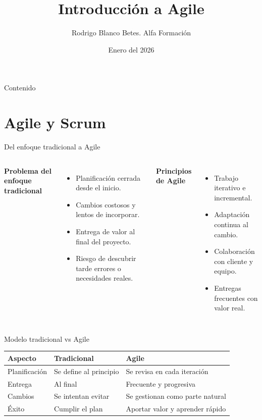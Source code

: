 \documentclass{beamer}
\title{Introducción a Agile}
\author{Rodrigo Blanco Betes. Alfa Formación}
\date{Enero del 2026}
\begin{document}
\begin{frame}
\titlepage
\end{frame}

\begin{frame}{Contenido}
\tableofcontents
\end{frame}

\section{Agile y Scrum}

\begin{frame}{Del enfoque tradicional a Agile}
\begin{columns}[T,onlytextwidth]
\textbf{Problema del enfoque tradicional}
\begin{itemize}
    \item Planificación cerrada desde el inicio.
    \item Cambios costosos y lentos de incorporar.
    \item Entrega de valor al final del proyecto.
    \item Riesgo de descubrir tarde errores o necesidades reales.
\end{itemize}

\textbf{Principios de Agile}
\begin{itemize}
    \item Trabajo iterativo e incremental.
    \item Adaptación continua al cambio.
    \item Colaboración con cliente y equipo.
    \item Entregas frecuentes con valor real.
\end{itemize}
\end{columns}
\end{frame}

\begin{frame}{Modelo tradicional vs Agile}
\vspace{0.4cm}
\small
\begin{tabularx}{\textwidth}{>{\RaggedRight\arraybackslash}p{} >{\RaggedRight\arraybackslash}X >{\RaggedRight\arraybackslash}X}
\toprule
\textbf{Aspecto} & \textbf{Tradicional} & \textbf{Agile} \\
\midrule
Planificación & Se define al principio & Se revisa en cada iteración \\
Entrega & Al final & Frecuente y progresiva \\
Cambios & Se intentan evitar & Se gestionan como parte natural \\
Éxito & Cumplir el plan & Aportar valor y aprender rápido \\
\bottomrule
\end{tabularx}
\end{frame}
\end{document}
